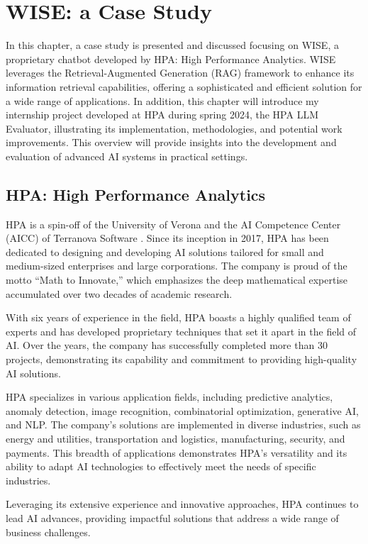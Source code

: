 \section{WISE: a Case Study}

In this chapter, a case study is presented and discussed  focusing on WISE, a proprietary chatbot developed by HPA: High Performance Analytics. WISE leverages the Retrieval-Augmented Generation (RAG) framework to enhance its information retrieval capabilities, offering a sophisticated and efficient solution for a wide range of applications. In addition, this chapter will introduce my internship project developed at HPA during spring 2024, the HPA LLM Evaluator, illustrating its implementation, methodologies, and potential work improvements. This overview will provide insights into the development and evaluation of advanced AI systems in practical settings.

\subsection{HPA: High Performance Analytics}

HPA is a spin-off of the University of Verona and the AI Competence Center (AICC) of Terranova Software \cite{terranova2024}. Since its inception in 2017, HPA has been dedicated to designing and developing AI solutions tailored for small and medium-sized enterprises and large corporations. The company is proud of the motto “Math to Innovate,” which emphasizes the deep mathematical expertise accumulated over two decades of academic research.

With six years of experience in the field, HPA boasts a highly qualified team of experts and has developed proprietary techniques that set it apart in the field of AI. Over the years, the company has successfully completed more than 30 projects, demonstrating its capability and commitment to providing high-quality AI solutions.

HPA specializes in various application fields, including predictive analytics, anomaly detection, image recognition, combinatorial optimization, generative AI, and NLP. The company's solutions are implemented in diverse industries, such as energy and utilities, transportation and logistics, manufacturing, security, and payments. This breadth of applications demonstrates HPA's versatility and its ability to adapt AI technologies to effectively meet the needs of specific industries.

Leveraging its extensive experience and innovative approaches, HPA continues to lead AI advances, providing impactful solutions that address a wide range of business challenges.

